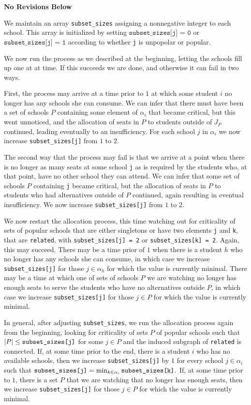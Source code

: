 \documentclass[12pt]{article}
\theoremstyle{definition}
\newcommand{\norev}{\medskip \centerline{\textbf{No Revisions Below}} \medskip}
\begin{document}
\norev

We maintain an array \texttt{subset\_sizes}
assigning a nonnegative integer to each school.  This array is
initialized by setting $\texttt{subset\_sizes[j] = 0}$ or
$\texttt{subset\_sizes[j] = 1}$ according to whether \texttt{j} is
unpopolar or popular.

We now run the process as we described at the beginning, letting the
schools fill up one at at time.  If this succeeds we are done, and
otherwise it can fail in two ways.

First, the process may arrive at a time prior to $1$ at which some
student $i$ no longer has any schools she can consume.  We can infer
that there must have been a set of schools $P$ containing some element
of $\alpha_i$ that became critical, but this went unnoticed, and the
allocation of seats in $P$ to students outside of $J_P$ continued,
leading eventually to an insufficiency.  For each school $j$ in
$\alpha_i$ we now increase \texttt{subset\_sizes[j]} from $1$ to $2$.

The second way that the process may fail is that we arrive at a point
when there is no longer as many seats at some school \texttt{j} as is
required by the students who, at that point, have no other school they
can attend.  We can infer that some set of schools $P$ containing
\texttt{j} became critical, but the allocation of seats in $P$ to
students who had alternatives outside of $P$ continued, again
resulting in eventual insufficiency.  We now increase
\texttt{subset\_sizes[j]} from $1$ to $2$.

We now restart the allocation process, this time watching out for
criticality of sets of popular schools that are either singletons or
have two elements \texttt{j} and \texttt{k}, that are
\texttt{related}, with \texttt{subset\_sizes[j] = 2} or
\texttt{subset\_sizes[k] = 2}.  Again, this may succeed. There may be
a time prior of $1$ when there is a student $h$ who no longer has any
schools she can consume, in which case we increase
\texttt{subset\_sizes[j]} for those $j \in \alpha_h$ for which the
value is currently minimal.  There may be a time at which one of sets
of schools $P$ we are watching no longer has enough seats to serve the
students who have no alternatives outside $P$, in which case we
increase \texttt{subset\_sizes[j]} for those $j \in P$ for which the
value is currently minimal.

In general, after adjusting \texttt{subset\_sizes}, we run the
allocation process again from the beginning, looking for criticality
of sets $P$ of popular schools such that $|P| \le
\text{\texttt{subset\_sizes[j]}}$ for some $j \in P$ and the induced
subgraph of \texttt{related} is connected.  If, at some time prior to
the end, there is a student $i$ who has no available schools, then we
increase \texttt{subset\_sizes[j]} by $1$ for every school $j \in
\alpha_i$ such that $\text{\texttt{subset\_sizes[j]}} = \min_{k \in
  \alpha_i} \text{\texttt{subset\_sizes[k]}}.$ If, at some time prior
to $1$, there is a set $P$ that we are watching that no longer has
enough seats, then we increase \texttt{subset\_sizes[j]} for those $j
\in P$ for which the value is currently minimal.
\end{document}

